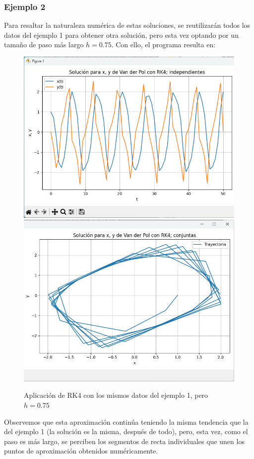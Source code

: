 \documentclass[12pt, a4paper]{article}
\begin{document}
\subsubsection{Ejemplo 2}

Para resaltar la naturaleza numérica de estas soluciones, se reutilizarán todos los datos del ejemplo 1 para obtener otra solución, pero esta vez optando por un tamaño de paso más largo \(h = 0.75\). Con ello, el programa resulta en:
\begin{figure}[H]
	\centering
	\includegraphics[scale=0.5]{../auxiliary/assets/ejemplo2-indiv.png}
	\includegraphics[scale=0.5]{../auxiliary/assets/ejemplo2-conj.png}
	\caption{Aplicación de RK4 con los mismos datos del ejemplo 1, pero \(h = 0.75\)}
\end{figure}
Observemos que esta aproximación continúa teniendo la misma tendencia que la del ejemplo 1 (la solución es la misma, después de todo), pero, esta vez, como el paso es más largo, se perciben los segmentos de recta individuales que unen los puntos de aproximación obtenidos numéricamente.
\end{document}
